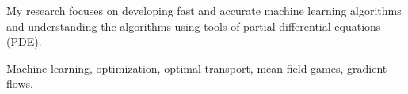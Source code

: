 

\begin{cvparagraph}


My research focuses on developing fast and accurate machine learning algorithms and understanding the algorithms using tools of partial differential equations (PDE).

Machine learning, optimization, optimal transport, mean field games, gradient flows.

\end{cvparagraph}